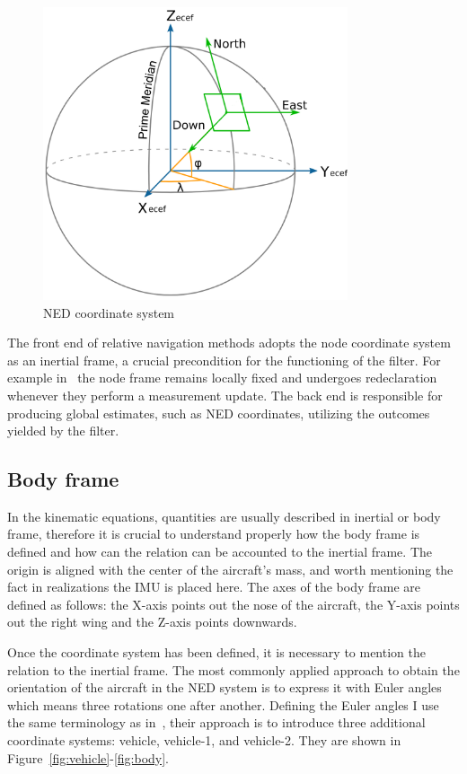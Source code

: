 \begin{figure}[!ht]
    \centering
    \includegraphics[width=0.8\textwidth]{figures/NED.png}
    \caption{NED coordinate system~\cite{gps_navigation_slide}}\label{fig:NED}
\end{figure}

The front end of relative navigation methods adopts the node coordinate system as an inertial frame, a crucial precondition for the functioning of the filter. For example in~\cite{rel-nav} the node frame remains locally fixed and undergoes redeclaration whenever they perform a measurement update. The back end is responsible for producing global estimates, such as NED coordinates, utilizing the outcomes yielded by the filter.

\subsection{Body frame}

In the kinematic equations, quantities are usually described in inertial or body frame, therefore it is crucial to understand properly how the body frame is defined and how can the relation can be accounted to the inertial frame. The origin is aligned with the center of the aircraft's mass, and worth mentioning the fact in realizations the IMU is placed here. The axes of the body frame are defined as follows: the X-axis points out the nose of the aircraft, the Y-axis points out the right wing and the Z-axis points downwards.

Once the coordinate system has been defined, it is necessary to mention the relation to the inertial frame. The most commonly applied approach to obtain the orientation of the aircraft in the NED system is to express it with Euler angles which means three rotations one after another. Defining the Euler angles I use the same terminology as in~\cite{EKF-UAS-2}, their approach is to introduce three additional coordinate systems: vehicle, vehicle-1, and vehicle-2. They are shown in Figure~\ref{fig:vehicle}-\ref{fig:body}.

